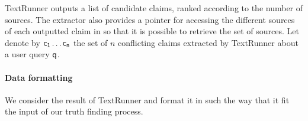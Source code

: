 TextRunner outputs a list of candidate claims, ranked according to the number of sources. The extractor also provides a pointer
for accessing the different sources of each outputted claim in so that it is possible to retrieve the set of sources. Let denote
by $\mathsf{c_{1}}\ldots \mathsf{c_{n}}$ the set of $n$ conflicting claims extracted by TextRunner about a user query $\mathsf{q}$.

\paragraph*{Data formatting}
We consider the result of TextRunner and format it in such the way 
that it fit the input of our truth finding process.